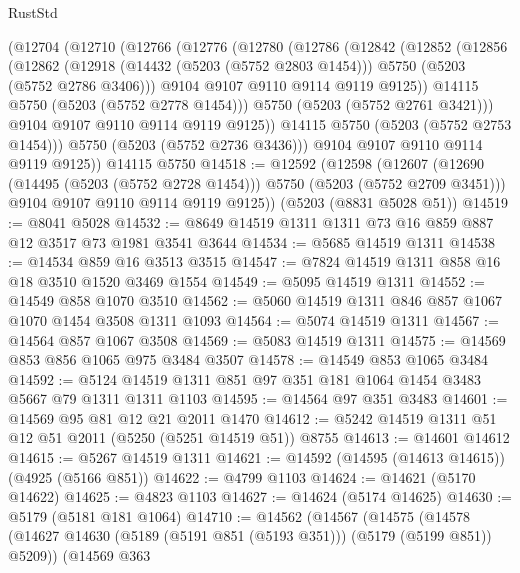 \begin{lexlean}{RustStd}
\begin{coremodule}
    (@12704
      (@12710
        (@12766
          (@12776
            (@12780
              (@12786
                (@12842
                  (@12852
                    (@12856
                      (@12862
                        (@12918
                          (@14432 (@5203 (@5752 @2803 @1454)))
                          @5750
                          (@5203 (@5752 @2786 @3406)))
                        @9104
                        @9107
                        @9110
                        @9114
                        @9119
                        @9125))
                    @14115
                    @5750
                    (@5203 (@5752 @2778 @1454)))
                  @5750
                  (@5203 (@5752 @2761 @3421)))
                @9104
                @9107
                @9110
                @9114
                @9119
                @9125))
            @14115
            @5750
            (@5203 (@5752 @2753 @1454)))
          @5750
          (@5203 (@5752 @2736 @3436)))
        @9104
        @9107
        @9110
        @9114
        @9119
        @9125))
    @14115
    @5750
@14518 := @12592
    (@12598
      (@12607
        (@12690 (@14495 (@5203 (@5752 @2728 @1454))) @5750 (@5203 (@5752 @2709 @3451)))
        @9104
        @9107
        @9110
        @9114
        @9119
        @9125))
    (@5203 (@8831 @5028 @51))
@14519 := @8041 @5028
@14532 := @8649 @14519 @1311 @1311 @73 @16 @859 @887 @12 @3517 @73 @1981 @3541 @3644
@14534 := @5685 @14519 @1311
@14538 := @14534 @859 @16 @3513 @3515
@14547 := @7824 @14519 @1311 @858 @16 @18 @3510 @1520 @3469 @1554
@14549 := @5095 @14519 @1311
@14552 := @14549 @858 @1070 @3510
@14562 := @5060 @14519 @1311 @846 @857 @1067 @1070 @1454 @3508 @1311 @1093
@14564 := @5074 @14519 @1311
@14567 := @14564 @857 @1067 @3508
@14569 := @5083 @14519 @1311
@14575 := @14569 @853 @856 @1065 @975 @3484 @3507
@14578 := @14549 @853 @1065 @3484
@14592 := @5124 @14519 @1311 @851 @97 @351 @181 @1064 @1454 @3483 @5667 @79 @1311 @1311 @1103
@14595 := @14564 @97 @351 @3483
@14601 := @14569 @95 @81 @12 @21 @2011 @1470
@14612 := @5242 @14519 @1311 @51 @12 @51 @2011 (@5250 (@5251 @14519 @51)) @8755
@14613 := @14601 @14612
@14615 := @5267 @14519 @1311
@14621 := @14592 (@14595 (@14613 @14615)) (@4925 (@5166 @851))
@14622 := @4799 @1103
@14624 := @14621 (@5170 @14622)
@14625 := @4823 @1103
@14627 := @14624 (@5174 @14625)
@14630 := @5179 (@5181 @181 @1064)
@14710 := @14562
    (@14567
      (@14575
        (@14578 (@14627 @14630 (@5189 (@5191 @851 (@5193 @351))) (@5179 (@5199 @851)) @5209))
        (@14569
          @363

\end{coremodule}
\end{lexlean}
